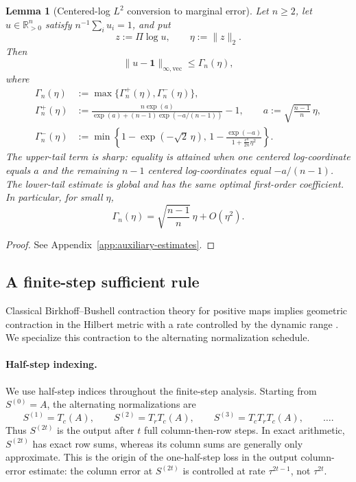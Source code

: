 \documentclass[10pt]{article}
\numberwithin{equation}{section}
\theoremstyle{plain}
\newtheorem{lemma}[theorem]{Lemma}
\theoremstyle{definition}
\theoremstyle{remark}
\newcommand{\R}{\mathbb{R}}
\newcommand{\ones}{\mathbf{1}}
\begin{document}
\begin{lemma}[Centered-log $L^2$ conversion to marginal error]\label{lem:Gamma}
Let \(n\ge2\), let $u\in\R^n_{>0}$ satisfy $n^{-1}\sum_i u_i=1$, and put
\[
        z:=\Pi\log u,
        \qquad
        \eta:=\|z\|_2.
\]
Then
\begin{equation}\label{eq:Gamma-bound}
        \|u-\ones\|_{\infty,\mathrm{vec}}
        \le
        \Gamma_n(\eta),
\end{equation}
where
\begin{align}\label{eq:Gamma-def}
        \Gamma_n(\eta)
        &:=
        \max\{\Gamma_n^+(\eta),\Gamma_n^-(\eta)\}, \\
        \Gamma_n^+(\eta)
        &:=
        \frac{n\exp(a)}
        {\exp(a)+(n-1)\exp\!\left(-a/(n-1)\right)}-1,
        \qquad a:=\sqrt{\frac{n-1}{n}}\,\eta, \nonumber\\
        \Gamma_n^-(\eta)
        &:=\min\left\{
        1-\exp(-\sqrt{2}\,\eta),\,
        1-\frac{\exp(-a)}{1+\frac{e^a}{2n}\eta^2}
        \right\}. \nonumber
\end{align}
The upper-tail term is sharp: equality is attained when one centered
log-coordinate equals $a$ and the remaining $n-1$ centered log-coordinates
equal $-a/(n-1)$. The lower-tail estimate is global and has the same optimal
first-order coefficient. In particular, for small $\eta$,
\begin{equation}\label{eq:Gamma-small}
        \Gamma_n(\eta)
        =
        \sqrt{\frac{n-1}{n}}\,\eta+O(\eta^2).
\end{equation}
\end{lemma}

\begin{proof}
See Appendix~\ref{app:auxiliary-estimates}.
\end{proof}


\subsection{A finite-step sufficient rule}\label{subsec:tmax-rule}
Classical Birkhoff--Bushell contraction theory for positive maps implies geometric contraction in the Hilbert metric with a
rate controlled by the dynamic range \citep{Birkhoff1957,Bushell1973}. We specialize this contraction to the alternating normalization schedule.

\paragraph{Half-step indexing.}
We use half-step indices throughout the finite-step analysis. Starting from \(S^{(0)}=A\), the alternating normalizations are
\begin{equation}
    S^{(1)}=T_c(A),\qquad
    S^{(2)}=T_rT_c(A),\qquad
    S^{(3)}=T_cT_rT_c(A),\qquad \ldots .
\end{equation}
Thus \(S^{(2t)}\) is the output after \(t\) full column-then-row steps.  In exact
arithmetic, \(S^{(2t)}\) has exact row sums, whereas its column sums are generally
only approximate.  This is the origin of the one-half-step loss in the output
column-error estimate: the column error at \(S^{(2t)}\) is controlled at rate
\(\tau^{2t-1}\), not \(\tau^{2t}\).
\end{document}
